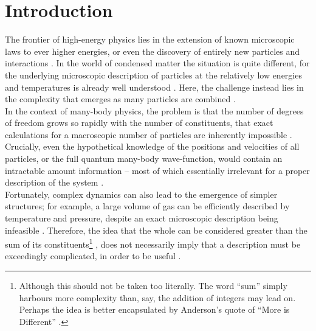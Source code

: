 \chapter{Introduction}\label{chap:int}
The frontier of high-energy physics lies in the extension of known microscopic laws to ever higher energies, or even the discovery of entirely new particles and interactions \cite{BeyondSM_Allanach_2017,ATLAS_2024}.
In the world of condensed matter the situation is quite different, for the underlying microscopic description of particles at the relatively low energies and temperatures is already well understood \cite{More_is_Different_Anderson_1972,Theory_of_Everything_Laughlin_2000,QMB_Coleman_2015}.
Here, the challenge instead lies in the complexity that emerges as many particles are combined \cite{Emergence_Short_Coleman_2007,QMB_Coleman_2015}.\\
In the context of many-body physics, the problem is that the number of degrees of freedom grows so rapidly with the number of constituents, that exact calculations for a macroscopic number of particles are inherently impossible \cite{Theory_of_Everything_Laughlin_2000}.
Crucially, even the hypothetical knowledge of the positions and velocities of all particles, or the full quantum many-body wave-function, would contain an intractable amount information -- most of which essentially irrelevant for a proper description of the system \cite[\spage vii]{OpenQuantumSystems_Breuer_2007}.\\
Fortunately, complex dynamics can also lead to the emergence of simpler structures; for example, a large volume of gas can be efficiently described by temperature and pressure, despite an exact microscopic description being infeasible \cite{QFT_Abrikosov_1975}.
Therefore, the idea that the whole can be considered greater than the sum of its constituents\footnote{Although this should not be taken too literally. The word ``sum'' simply harbours more complexity than, say, the addition of integers may lead on. Perhaps the idea is better encapsulated by Anderson's quote of ``More is Different'' \cite{More_is_Different_Anderson_1972}.} \cite{Gogolin_1999}, does not necessarily imply that a description must be exceedingly complicated, in order to be useful \cite{QMB_Coleman_2015}.
